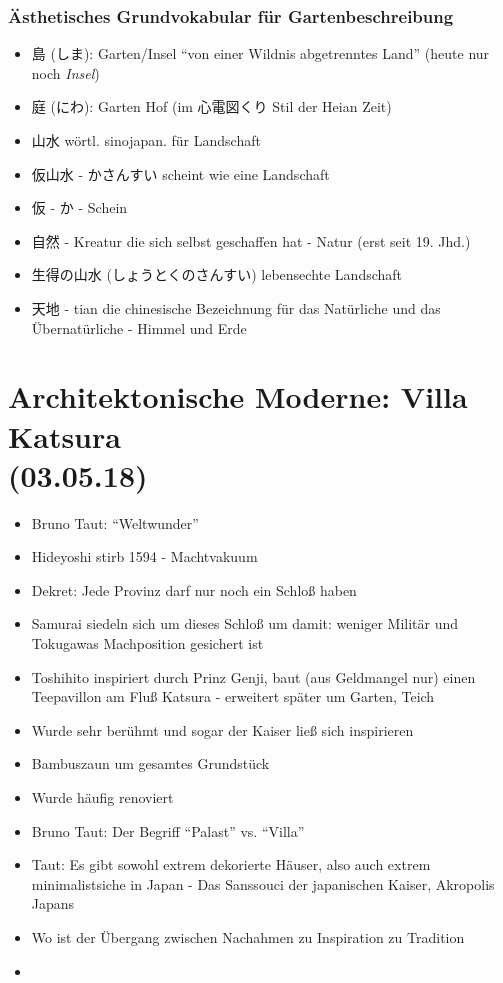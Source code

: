 \documentclass[emulatestandardclasses]{scrartcl}
\begin{document}
\subsubsection{Ästhetisches Grundvokabular für Gartenbeschreibung}

\begin{itemize}
  \item 島 (しま): Garten/Insel "`von einer Wildnis abgetrenntes Land"' (heute nur noch \emph{Insel})
  \item 庭 (にわ): Garten Hof (im 心電図くり Stil der Heian Zeit)
  \item 山水 wörtl. sinojapan. für Landschaft
  \item 仮山水 - かさんすい scheint wie eine Landschaft
  \item 仮 - か - Schein
  \item 自然 - Kreatur die sich selbst geschaffen hat - Natur (erst seit 19. Jhd.)
  \item 生得の山水 (しょうとくのさんすい) lebensechte Landschaft
  \item 天地 - tian die chinesische Bezeichnung für das Natürliche und das Übernatürliche - Himmel und Erde
\end{itemize}



\section{Architektonische Moderne: Villa Katsura\\(03.05.18)}

\begin{itemize}
  \item Bruno Taut: "`Weltwunder"'
  \item Hideyoshi stirb 1594 - Machtvakuum
  \item Dekret: Jede Provinz darf nur noch ein Schloß haben
  \item Samurai siedeln sich um dieses Schloß um damit: weniger Militär und Tokugawas Machposition gesichert ist
  \item Toshihito inspiriert durch Prinz Genji, baut (aus Geldmangel nur) einen Teepavillon am Fluß Katsura - erweitert später um Garten, Teich
  \item Wurde sehr berühmt und sogar der Kaiser ließ sich inspirieren
  \item Bambuszaun um gesamtes Grundstück
  \item Wurde häufig renoviert
  \item Bruno Taut: Der Begriff "`Palast"' vs. "`Villa"'
  \item Taut: Es gibt sowohl extrem dekorierte Häuser, also auch extrem minimalistsiche in Japan - Das Sanssouci der japanischen Kaiser, Akropolis Japans
  \item Wo ist der Übergang zwischen Nachahmen zu Inspiration zu Tradition 
  \item 
\end{itemize}
\end{document}
